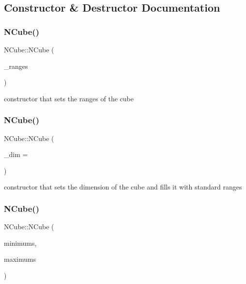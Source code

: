 \subsection{Constructor \& Destructor Documentation}
\mbox{\label{class_n_cube_ac5458bbe42846badcbd2100825a76556}} 
\subsubsection{\texorpdfstring{N\+Cube()}{NCube()}\hspace{0.1cm}{\footnotesize\ttfamily [1/3]}}
{\footnotesize\ttfamily N\+Cube\+::\+N\+Cube (\begin{DoxyParamCaption}\item[{const Range\+Vec \&}]{\+\_\+ranges }\end{DoxyParamCaption})\hspace{0.3cm}{\ttfamily [inline]}}

constructor that sets the ranges of the cube \mbox{\label{class_n_cube_a2eeaca555a32a13ed8fc58e2e83b1ec4}} 
\subsubsection{\texorpdfstring{N\+Cube()}{NCube()}\hspace{0.1cm}{\footnotesize\ttfamily [2/3]}}
{\footnotesize\ttfamily N\+Cube\+::\+N\+Cube (\begin{DoxyParamCaption}\item[{int}]{\+\_\+dim = {} }\end{DoxyParamCaption})}

constructor that sets the dimension of the cube and fills it with standard ranges \mbox{\label{class_n_cube_a6b4535debc936abca85e563f5b4e1d67}} 
\subsubsection{\texorpdfstring{N\+Cube()}{NCube()}\hspace{0.1cm}{\footnotesize\ttfamily [3/3]}}
{\footnotesize\ttfamily N\+Cube\+::\+N\+Cube (\begin{DoxyParamCaption}\item[{std\+::vector$<$ double $>$ \&}]{minimums,  }\item[{std\+::vector$<$ double $>$ \&}]{maximums }\end{DoxyParamCaption})}

